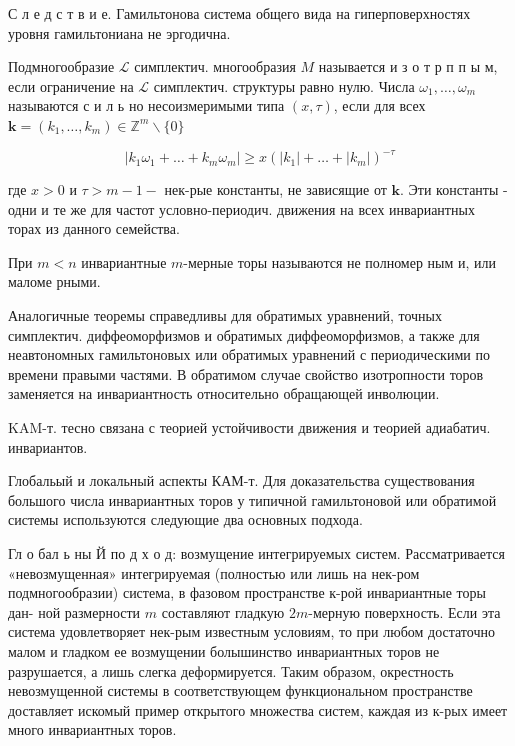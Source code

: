 \documentclass[10pt]{article}
\begin{document}
С л е д с т в и е. Гамильтонова система общего вида на гиперповерхностях уровня гамильтониана не эргодична.



Подмногообразие $\mathscr{L}$ симплектич. многообразия $M$ называется и з о т р п п ы м, если ограничение на $\mathscr{L}$ симплектич. структуры равно нулю. Числа $\omega_{1}, \ldots, \omega_{m}$ называются с и л ь но несоизмеримыми типа $(x, \tau)$, если для всех $\boldsymbol{k}=\left(k_{1}, \ldots, k_{m}\right) \in \mathbb{Z}^{m} \backslash\{0\}$



\[

\left|k_{1} \omega_{1}+\ldots+k_{m} \omega_{m}\right| \geqslant x\left(\left|k_{1}\right|+\ldots+\left|k_{m}\right|\right)^{-\tau}

\]



где $x>0$ и $\tau>m-1-$ нек-рые константы, не зависящие от $\boldsymbol{k}$. Эти константы - одни и те же для частот условно-периодич. движения на всех инвариантных торах из данного семейства.



При $m<n$ инвариантные $m$-мерные торы называются не полномер ным и, или маломе рными.



Аналогичные теоремы справедливы для обратимых уравнений, точных симплектич. диффеоморфизмов и обратимых диффеоморфизмов, а также для неавтономных гамильтоновых или обратимых уравнений с периодическими по времени правыми частями. В обратимом случае свойство изотропности торов заменяется на инвариантность относительно обращающей инволюции.



KAM-т. тесно связана с теорией устойчивости движения и теорией адиабатич. инвариантов.



Глобальый и локальный аспекты КАМ-т. Для доказательства существования большого числа инвариантных торов у типичной гамильтоновой или обратимой системы используются следующие два основных подхода.



Гл о бал ь ны Й по д х о д: возмущение интегрируемых систем. Рассматривается «невозмущенная» интегрируемая (полностью или лишь на нек-ром подмногообразии) система, в фазовом пространстве к-рой инвариантные торы дан- ной размерности $m$ составляют гладкую $2 m$-мерную поверхность. Если эта система удовлетворяет нек-рым известным условиям, то при любом достаточно малом и гладком ее возмущении болышинство инвариантных торов не разрушается, а лишь слегка деформируется. Таким образом, окрестность невозмущенной системы в соответствующем функциональном пространстве доставляет искомый пример открытого множества систем, каждая из к-рых имеет много инвариантных торов.
\end{document}
